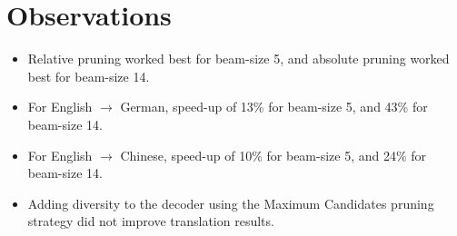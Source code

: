 \documentclass[12pt]{scrartcl}
\begin{document}
\section{Observations}
  \begin{itemize}
    \item Relative pruning worked best for beam-size 5, and absolute pruning worked best for beam-size 14.
    \item For English $\rightarrow$ German, speed-up of 13\% for beam-size 5, and 43\% for beam-size 14.
    \item For English $\rightarrow$ Chinese, speed-up of 10\% for beam-size 5, and 24\% for beam-size 14.
    \item Adding diversity to the decoder using the Maximum Candidates pruning strategy did not improve translation results.
  \end{itemize}



\end{document}
